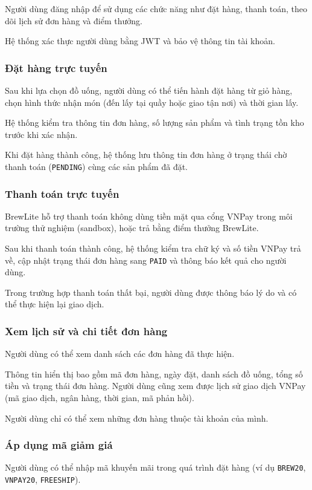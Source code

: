 \documentclass[12pt,a4paper]{article}
\begin{document}
Người dùng đăng nhập để sử dụng các chức năng như đặt hàng, thanh toán, theo dõi lịch sử đơn hàng và điểm thưởng.

Hệ thống xác thực người dùng bằng JWT và bảo vệ thông tin tài khoản.

\subsubsection{Đặt hàng trực tuyến}
Sau khi lựa chọn đồ uống, người dùng có thể tiến hành đặt hàng từ giỏ hàng, chọn hình thức nhận món (đến lấy tại quầy hoặc giao tận nơi) và thời gian lấy.

Hệ thống kiểm tra thông tin đơn hàng, số lượng sản phẩm và tình trạng tồn kho trước khi xác nhận.

Khi đặt hàng thành công, hệ thống lưu thông tin đơn hàng ở trạng thái chờ thanh toán (\texttt{PENDING}) cùng các sản phẩm đã đặt.

\subsubsection{Thanh toán trực tuyến}
BrewLite hỗ trợ thanh toán không dùng tiền mặt qua cổng VNPay trong môi trường thử nghiệm (sandbox), hoặc trả bằng điểm thưởng BrewLite.

Sau khi thanh toán thành công, hệ thống kiểm tra chữ ký và số tiền VNPay trả về, cập nhật trạng thái đơn hàng sang \texttt{PAID} và thông báo kết quả cho người dùng.

Trong trường hợp thanh toán thất bại, người dùng được thông báo lý do và có thể thực hiện lại giao dịch.

\subsubsection{Xem lịch sử và chi tiết đơn hàng}
Người dùng có thể xem danh sách các đơn hàng đã thực hiện.

Thông tin hiển thị bao gồm mã đơn hàng, ngày đặt, danh sách đồ uống, tổng số tiền và trạng thái đơn hàng. Người dùng cũng xem được lịch sử giao dịch VNPay (mã giao dịch, ngân hàng, thời gian, mã phản hồi).

Người dùng chỉ có thể xem những đơn hàng thuộc tài khoản của mình.

\subsubsection{Áp dụng mã giảm giá}
Người dùng có thể nhập mã khuyến mãi trong quá trình đặt hàng (ví dụ \texttt{BREW20}, \texttt{VNPAY20}, \texttt{FREESHIP}).
\end{document}
